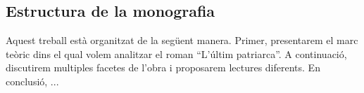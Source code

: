 \subsection{Estructura de la monografia}
Aquest treball està organitzat de la següent manera.
Primer, presentarem el marc teòric dins el qual volem analitzar el roman ``L'últim patriarca''.
A continuació, discutirem multiples facetes de l'obra i proposarem lectures diferents.
En conclusió, ...

\begin{comment}
Fragestellung:
??
verschiedene readings anbieten:
* interseccionalitat
* translation/language
* laurie penny

--> adrienne rich/anette kolodny in die intro nehmen
Annette Kolodny: "In my view, our purpose is not and should not be the formulation of
any single reading method or potentially procrustean set of critical procedures[...] Instead, as I see it, our
task is to initiate nothing less than a playful pluralism, responsice to the possibilities of multiple critical
schools and methods, but captive of none.."

Leitfragen/themen:
* Qui és català? Qui decideix?
* La dona entre dues cultures i dues societats: expectacions, sentiments,... | interseccionalitat
* La dona en una societat machista                                           |
* coming-of-age
* el paper de la llengua

------

Motto candidates:

“The greatest masterpiece in literature is only a dictionary out of order.”
― Jean Cocteau
VA: Jean Cocteau once quipped that even the greatest masterpieces of literature are nothing but a
dictionary out of order.
(Stavans: Dictionaries Interview)

"IS: Every translation is a misrepresentation."
(Stavans: Dictionaries Interview)
\end{comment}
